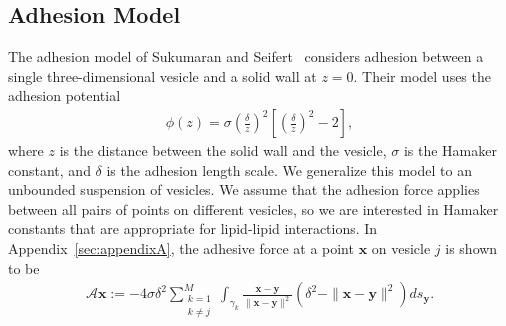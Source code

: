 \documentclass[%
preprint,
 amsmath,amssymb,
 aps,
]{revtex4-1}
\renewcommand{\AA}{\mathcal{A}}
\newcommand{\xx}{\mathbf{x}}
\newcommand{\yy}{\mathbf{y}}
\begin{document}
\subsection{Adhesion Model}
The adhesion model of Sukumaran and Seifert~\cite{suk-sei2001,
RamachandranAndersonLealIsraelachvili2010_Langmuir} considers adhesion
between a single three-dimensional vesicle and a solid wall at $z=0$.
Their model uses the adhesion potential
\begin{align*}
  \phi(z) = \sigma\left(\frac{\delta}{z}\right)^2 \left[ 
    \left(\frac{\delta}{z}\right)^2 - 2 \right],
\end{align*}
where $z$ is the distance between the solid wall and the vesicle,
$\sigma$ is the Hamaker constant, and $\delta$ is the adhesion length
scale.  We generalize this model to an unbounded suspension of vesicles.
We assume that the adhesion force applies between all pairs of points on
different vesicles, so we are interested in Hamaker constants that are
appropriate for lipid-lipid interactions. In
Appendix~\ref{sec:appendixA}, the adhesive force at a point $\xx$ on
vesicle $j$ is shown to be
\begin{align}
  \AA\xx:=-4 \sigma \delta^2\sum_{\substack{k=1 \\ k \neq j}}^M 
  \int_{\gamma_k} \frac{\xx - \yy}{\|\xx - \yy\|^2} 
  \left(\delta^2 - \|\xx - \yy\|^2 \right) ds_\yy.
  \label{eqn:adhesionForce}
\end{align}




\end{document}

